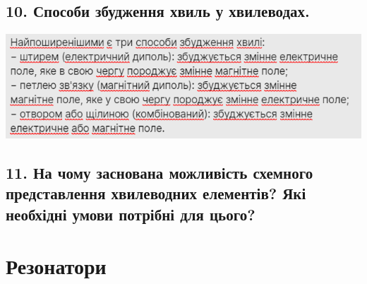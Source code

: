 \documentclass[a4paper,14pt]{extreport}
\begin{document}
\section{10. Способи збудження хвиль у хвилеводах.}
\includegraphics[scale=0.9]{9.png}\par
\section{11. На чому заснована можливість схемного представлення хвилеводних елементів? Які необхідні умови потрібні для цього?}

\chapter{Резонатори}
\end{document}
